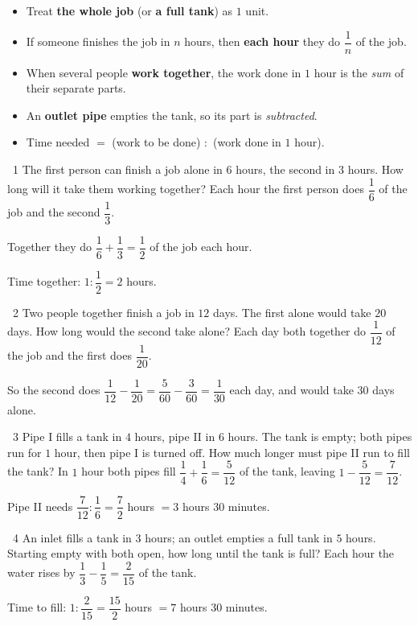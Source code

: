 \begin{knowbox}
\begin{itemize}[leftmargin=1.4em,itemsep=3pt]
\item Treat \textbf{the whole job} (or \textbf{a full tank}) as $1$ unit.
\item If someone finishes the job in $n$ hours, then \textbf{each hour} they do $\dfrac1n$ of the job.
\item When several people \textbf{work together}, the work done in $1$ hour is the \emph{sum} of their separate parts.
\item An \textbf{outlet pipe} empties the tank, so its part is \emph{subtracted}.
\item Time needed $=$ (work to be done) $:$ (work done in $1$ hour).
\end{itemize}
\end{knowbox}
\gap
\begin{exbox}{\ExWord\ 1}
The first person can finish a job alone in $6$ hours, the second in $3$ hours. How long will it take them working together?
\guide
Each hour the first person does $\dfrac16$ of the job and the second $\dfrac13$.\par
Together they do $\dfrac16+\dfrac13=\dfrac12$ of the job each hour.\par
Time together: $1:\dfrac12=2$ hours.
\end{exbox}
\gap
\begin{exbox}{\ExWord\ 2}
Two people together finish a job in $12$ days. The first alone would take $20$ days. How long would the second take alone?
\guide
Each day both together do $\dfrac1{12}$ of the job and the first does $\dfrac1{20}$.\par
So the second does $\dfrac1{12}-\dfrac1{20}=\dfrac5{60}-\dfrac3{60}=\dfrac1{30}$ each day, and would take $30$ days alone.
\end{exbox}
\gap
\begin{exbox}{\ExWord\ 3}
Pipe I fills a tank in $4$ hours, pipe II in $6$ hours. The tank is empty; both pipes run for $1$ hour, then pipe I is turned off. How much longer must pipe II run to fill the tank?
\guide
In $1$ hour both pipes fill $\dfrac14+\dfrac16=\dfrac5{12}$ of the tank, leaving $1-\dfrac5{12}=\dfrac7{12}$.\par
Pipe II needs $\dfrac7{12}:\dfrac16=\dfrac72$ hours $=3$ hours $30$ minutes.
\end{exbox}
\gap
\begin{exbox}{\ExWord\ 4}
An inlet fills a tank in $3$ hours; an outlet empties a full tank in $5$ hours. Starting empty with both open, how long until the tank is full?
\guide
Each hour the water rises by $\dfrac13-\dfrac15=\dfrac2{15}$ of the tank.\par
Time to fill: $1:\dfrac2{15}=\dfrac{15}2$ hours $=7$ hours $30$ minutes.
\end{exbox}
